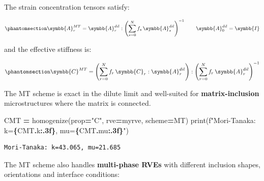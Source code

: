 \documentclass[
  a4paper,
  numbers=noendperiod,
  DIV=12]{scrreprt}
\newenvironment{Shaded}{\begin{snugshade}}{\end{snugshade}}
\newcommand{\BuiltInTok}[1]{#1}
\newcommand{\NormalTok}[1]{#1}
\newcommand{\OperatorTok}[1]{\textcolor[rgb]{0.81,0.36,0.00}{\textbf{#1}}}
\newcommand{\SpecialCharTok}[1]{\textcolor[rgb]{0.81,0.36,0.00}{\textbf{#1}}}
\newcommand{\SpecialStringTok}[1]{\textcolor[rgb]{0.31,0.60,0.02}{#1}}
\newcommand{\StringTok}[1]{\textcolor[rgb]{0.31,0.60,0.02}{#1}}
\newcommand{\uuuu}[1]{{\symbb{{#1}}}}
\begin{document}
The strain concentration tensors satisfy:

\begin{equation}\protect\phantomsection\label{eq-A-mt}{
\uuuu{A}_r^{MT} = \uuuu{A}_r^{dil} : \left(\sum_{s=0}^{N} f_s \,\uuuu{A}_s^{dil}\right)^{-1}
\qquad \uuuu{A}_0^{dil} = \uuuu{I}
}\end{equation}

and the effective stiffness is:

\begin{equation}\protect\phantomsection\label{eq-C-mt}{
\uuuu{C}^{MT} = \left(\sum_{r=0}^{N} f_r \,\uuuu{C}_r : \uuuu{A}_r^{dil}\right) : \left(\sum_{r=0}^{N} f_r \,\uuuu{A}_r^{dil}\right)^{-1}
}\end{equation}

The MT scheme is exact in the dilute limit and well-suited for
\textbf{matrix-inclusion} microstructures where the matrix is connected.

\begin{Shaded}
\begin{Highlighting}[]
\NormalTok{CMT }\OperatorTok{=}\NormalTok{ homogenize(prop}\OperatorTok{=}\StringTok{"C"}\NormalTok{, rve}\OperatorTok{=}\NormalTok{myrve, scheme}\OperatorTok{=}\NormalTok{MT)}
\BuiltInTok{print}\NormalTok{(}\SpecialStringTok{f"Mori{-}Tanaka: k=}\SpecialCharTok{\{}\NormalTok{CMT}\SpecialCharTok{.}\NormalTok{k}\SpecialCharTok{:.3f\}}\SpecialStringTok{, mu=}\SpecialCharTok{\{}\NormalTok{CMT}\SpecialCharTok{.}\NormalTok{mu}\SpecialCharTok{:.3f\}}\SpecialStringTok{"}\NormalTok{)}
\end{Highlighting}
\end{Shaded}

\begin{verbatim}
Mori-Tanaka: k=43.065, mu=21.685
\end{verbatim}

The MT scheme also handles \textbf{multi-phase RVEs} with different
inclusion shapes, orientations and interface conditions:
\end{document}
